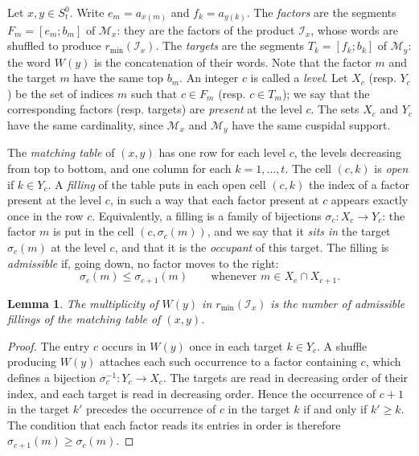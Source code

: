\documentclass[a4paper,12pt,leqno]{amsart}
\newcommand{\caI}{\mathcal{I}}
\newcommand{\caM}{\mathcal{M}}
\theoremstyle{plain}
\newtheorem{lemma}[thm]{Lemma}
\theoremstyle{definition}
\theoremstyle{definition}
\begin{document}
Let $x,y\in S_t^0$. Write $e_m=a_{x(m)}$ and $f_k=a_{y(k)}$. The \emph{factors} are the segments
$F_m=[e_m;b_m]$ of $\caM_x$: they are the factors of the product $\caI_x$, whose words are shuffled
to produce $r_{\min}(\caI_x)$. The \emph{targets} are the segments $T_k=[f_k;b_k]$ of $\caM_y$: the
word $W(y)$ is the concatenation of their words. Note that the factor $m$ and the target $m$ have
the same top $b_m$. An integer $c$ is called a \emph{level}. Let $X_c$ (resp. $Y_c$) be the set of
indices $m$ such that $c\in F_m$ (resp. $c\in T_m$); we say that the corresponding factors (resp.
targets) are \emph{present} at the level $c$. The sets $X_c$ and $Y_c$ have the same cardinality,
since $\caM_x$ and $\caM_y$ have the same cuspidal support.

The \emph{matching table} of $(x,y)$ has one row for each level $c$, the levels decreasing from top
to bottom, and one column for each $k=1,\ldots,t$. The cell $(c,k)$ is \emph{open} if $k\in Y_c$. A
\emph{filling} of the table puts in each open cell $(c,k)$ the index of a factor present at the level
$c$, in such a way that each factor present at $c$ appears exactly once in the row $c$. Equivalently,
a filling is a family of bijections $\sigma_c:X_c\rightarrow Y_c$: the factor $m$ is put in the cell
$(c,\sigma_c(m))$, and we say that it \emph{sits in} the target $\sigma_c(m)$ at the level $c$, and
that it is the \emph{occupant} of this target. The filling is \emph{admissible} if, going down, no
factor moves to the right:
\[\sigma_c(m)\leq\sigma_{c+1}(m)\qquad\text{whenever }m\in X_c\cap X_{c+1}.\]

\begin{lemma}\label{lem:matching} The multiplicity of $W(y)$ in $r_{\min}(\caI_x)$ is the number of
admissible fillings of the matching table of $(x,y)$.
\end{lemma}

\begin{proof}
The entry $c$ occurs in $W(y)$ once in each target $k\in Y_c$. A shuffle producing $W(y)$ attaches
each such occurrence to a factor containing $c$, which defines a bijection
$\sigma_c^{-1}:Y_c\rightarrow X_c$. The targets are read in decreasing order of their index, and
each target is read in decreasing order. Hence the occurrence of $c+1$ in the target $k'$ precedes
the occurrence of $c$ in the target $k$ if and only if $k'\geq k$. The condition that each factor
reads its entries in order is therefore $\sigma_{c+1}(m)\geq\sigma_c(m)$.
\end{proof}
\end{document}

